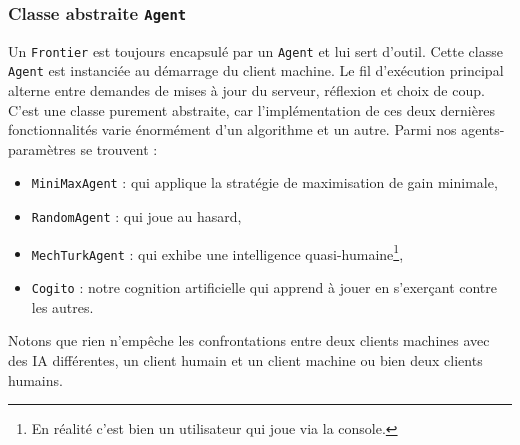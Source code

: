 \subsubsection{Classe abstraite \texttt{Agent}}
Un \texttt{Frontier} est toujours encapsulé par un \texttt{Agent} et lui sert d'outil. Cette classe \texttt{Agent} est instanciée au démarrage du client machine. Le fil d'exécution principal alterne entre demandes de mises à jour du serveur, réflexion et choix de coup. C'est une classe purement abstraite, car l'implémentation de ces deux dernières fonctionnalités varie énormément d'un algorithme et un autre. Parmi nos agents-paramètres se trouvent :
\begin{itemize}
\item \texttt{MiniMaxAgent} : qui applique la stratégie de maximisation de gain minimale,
\item \texttt{RandomAgent} : qui joue au hasard,
\item \texttt{MechTurkAgent} : qui exhibe une intelligence quasi-humaine\footnote{En réalité c'est bien un utilisateur qui joue via la console.},
\item \texttt{Cogito} : notre cognition artificielle qui apprend à jouer en s'exerçant contre les autres.
\end{itemize}
Notons que rien n'empêche les confrontations entre deux clients machines avec des IA différentes, un client humain et un client machine ou bien deux clients humains.